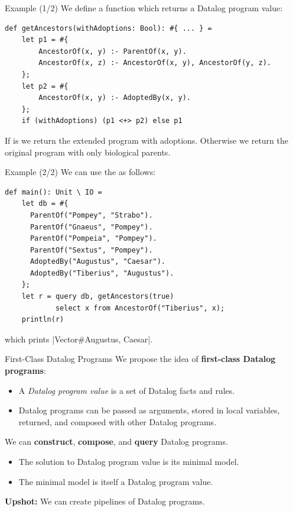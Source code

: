 \begin{frame}[fragile]{Example (1/2)}
We define a function which returns a Datalog program value:

\begin{lstlisting}[language=flix, xleftmargin=0.8cm]
def getAncestors(withAdoptions: Bool): #{ ... } =
    let p1 = #{
        AncestorOf(x, y) :- ParentOf(x, y).
        AncestorOf(x, z) :- AncestorOf(x, y), AncestorOf(y, z).
    };
    let p2 = #{
        AncestorOf(x, y) :- AdoptedBy(x, y). 
    };
    if (withAdoptions) (p1 <+> p2) else p1
\end{lstlisting}

If  is  we return the extended program with
adoptions. Otherwise we return the original program with only biological
parents. 
\end{frame}

\begin{frame}[fragile]{Example (2/2)}
We can use the  as follows:

\begin{lstlisting}[language=flix, xleftmargin=0.8cm]
def main(): Unit \ IO = 
    let db = #{
      ParentOf("Pompey", "Strabo").
      ParentOf("Gnaeus", "Pompey").
      ParentOf("Pompeia", "Pompey").
      ParentOf("Sextus", "Pompey").
      AdoptedBy("Augustus", "Caesar").
      AdoptedBy("Tiberius", "Augustus").
    };
    let r = query db, getAncestors(true) 
            select x from AncestorOf("Tiberius", x);
    println(r)
\end{lstlisting}

which prints \Code|Vector#{Augustus, Caesar}|.
\end{frame}

\begin{frame}{First-Class Datalog Programs}
We propose the idea of \textbf{first-class Datalog programs}:

\begin{itemize}
    \item A \emph{Datalog program value} is a set of Datalog facts and rules.
    \item Datalog programs can be passed as arguments, stored in local
    variables, returned, and composed with other Datalog programs.
\end{itemize}

\pause

We can \textbf{construct}, \textbf{compose}, and \textbf{query} Datalog programs.

\begin{itemize}
    \item The solution to Datalog program value is its minimal model.
    \item The minimal model is itself a Datalog program value.
\end{itemize}

\textbf{Upshot:} We can create pipelines of Datalog programs.
\end{frame}

